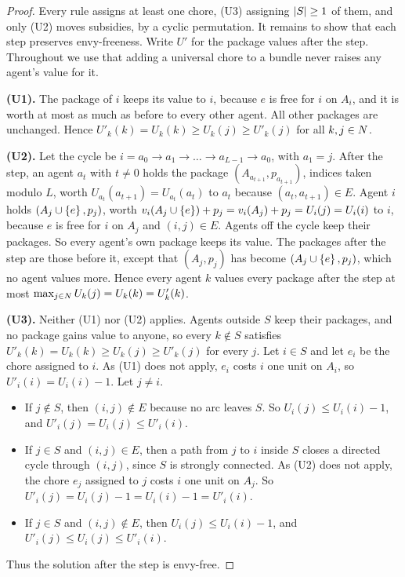 \begin{proof}
Every rule assigns at least one chore, (U3) assigning $\left\lvert S\right\rvert\ge1$ of them, and
only (U2) moves subsidies, by a cyclic permutation. It remains to show that each
step preserves envy-freeness. Write $U'$ for the package values after the step.
Throughout we use that adding a universal chore to a bundle never raises any
agent's value for it.

\smallskip\noindent\textbf{(U1).} The package of $i$ keeps its value to $i$,
because $e$ is free for $i$ on $A_i$, and it is worth at most as much as before to
every other agent. All other packages are unchanged. Hence
$U'_k(k)=U_k(k)\ge U_k(j)\ge U'_k(j)$ for all $k,j\in N$.

\smallskip\noindent\textbf{(U2).} Let the cycle be
$i=a_0\to a_1\to\dots\to a_{L-1}\to a_0$, with $a_1=j$. After the step, an agent
$a_t$ with $t\ne0$ holds the package $(A_{a_{t+1}},p_{a_{t+1}})$, indices taken
modulo $L$, worth $U_{a_t}(a_{t+1})=U_{a_t}(a_t)$ to $a_t$ because
$(a_t,a_{t+1})\in E$. Agent $i$ holds $(A_j\cup\left\{e\right\},p_j)$, worth
$v_i(A_j\cup\left\{e\right\})+p_j=v_i(A_j)+p_j=U_i(j)=U_i(i)$ to $i$, because $e$ is free
for $i$ on $A_j$ and $(i,j)\in E$. Agents off the cycle keep their packages. So
every agent's own package keeps its value. The packages after the step are those
before it, except that $(A_j,p_j)$ has become $(A_j\cup\left\{e\right\},p_j)$, which no
agent values more. Hence every agent $k$ values every package after the step at
most $\max_{j\in N}U_k(j)=U_k(k)=U'_k(k)$.

\smallskip\noindent\textbf{(U3).} Neither (U1) nor (U2) applies. Agents outside
$S$ keep their packages, and no package gains value to anyone, so every
$k\notin S$ satisfies $U'_k(k)=U_k(k)\ge U_k(j)\ge U'_k(j)$ for every $j$. Let
$i\in S$ and let $e_i$ be the chore assigned to $i$. As (U1) does not apply,
$e_i$ costs $i$ one unit on $A_i$, so $U'_i(i)=U_i(i)-1$. Let $j\ne i$.
\begin{itemize}
  \item If $j\notin S$, then $(i,j)\notin E$ because no arc leaves $S$. So
    $U_i(j)\le U_i(i)-1$, and $U'_i(j)=U_i(j)\le U'_i(i)$.
  \item If $j\in S$ and $(i,j)\in E$, then a path from $j$ to $i$ inside $S$
    closes a directed cycle through $(i,j)$, since $S$ is strongly connected. As
    (U2) does not apply, the chore $e_j$ assigned to $j$ costs $i$ one unit on
    $A_j$. So $U'_i(j)=U_i(j)-1=U_i(i)-1=U'_i(i)$.
  \item If $j\in S$ and $(i,j)\notin E$, then $U_i(j)\le U_i(i)-1$, and
    $U'_i(j)\le U_i(j)\le U'_i(i)$.
\end{itemize}
Thus the solution after the step is envy-free.
\end{proof}

